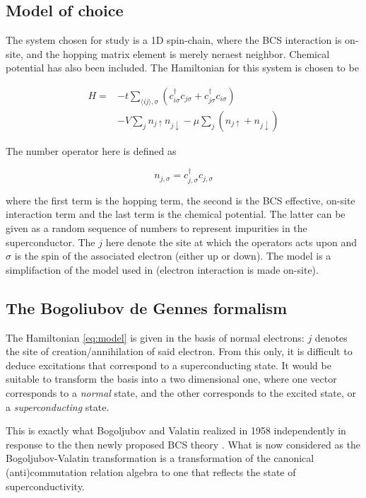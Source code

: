 \documentclass[11pt,twocolumn]{article}
\begin{document}
\subsection{Model of choice}

The system chosen for study is a 1D spin-chain, where the BCS interaction is on-site, and the hopping matrix element is merely neraest neighbor. Chemical potential has also been included. The Hamiltonian for this system is chosen to be 

\begin{align}\label{eq:model}
	H = &-t \sum_{\langle i j\rangle, \sigma}\left(c_{i \sigma}^{\dagger} c_{j \sigma} + c_{j \sigma}^{\dagger} c_{i \sigma}\right) \nonumber \\ 
	    &- V \sum_j n_{j \uparrow} n_{j \downarrow} -\mu \sum_j\left(n_{j \uparrow}+n_{j \downarrow}\right) 
\end{align}

The number operator here is defined as

\begin{equation}
	n_{j, \sigma} = c_{j, \sigma}^\dagger c_{j, \sigma}
\end{equation}

where the first term is the hopping term, the second is the BCS effective, on-site interaction term and the last term is the chemical potential. The latter can be given as a random sequence of numbers to represent impurities in the superconductor.  The $j$ here denote the site at which the operators acts upon and $\sigma$ is the spin of the associated electron (either up or down). The model is a simplifaction of the model used in \cite{zhangChiralPwaveSuperconducting2019} (electron interaction is made on-site). 

\subsection{The Bogoliubov de Gennes formalism}
The Hamiltonian \eqref{eq:model} is given in the basis of normal electrons: $j$ denotes the site of creation/annihilation of said electron. From this only, it is difficult to deduce excitations that correspond to a superconducting state. It would be suitable to transform the basis into a two dimensional one, where one vector corresponds to a \textit{normal} state, and the other corresponds to the excited state, or a \textit{superconducting} state.

This is exactly what Bogoljubov and Valatin realized in 1958 independently in response to the then newly proposed BCS theory \cite{bogoljubovNewMethodTheory1958, valatinCommentsTheorySuperconductivity1958}. What is now considered as the Bogoljubov-Valatin transformation is a transformation of the canonical (anti)commutation relation algebra to one that reflects the state of superconductivity. 
\end{document}
